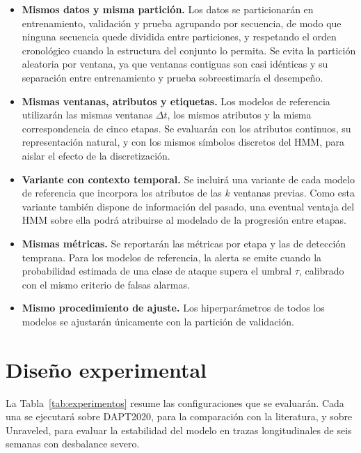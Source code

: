 \begin{itemize}
    \item \textbf{Mismos datos y misma partición.} Los datos se particionarán en entrenamiento, validación y prueba agrupando por secuencia, de modo que ninguna secuencia quede dividida entre particiones, y respetando el orden cronológico cuando la estructura del conjunto lo permita. Se evita la partición aleatoria por ventana, ya que ventanas contiguas son casi idénticas y su separación entre entrenamiento y prueba sobreestimaría el desempeño.
    \item \textbf{Mismas ventanas, atributos y etiquetas.} Los modelos de referencia utilizarán las mismas ventanas $\Delta t$, los mismos atributos y la misma correspondencia de cinco etapas. Se evaluarán con los atributos continuos, su representación natural, y con los mismos símbolos discretos del HMM, para aislar el efecto de la discretización.
    \item \textbf{Variante con contexto temporal.} Se incluirá una variante de cada modelo de referencia que incorpora los atributos de las $k$ ventanas previas. Como esta variante también dispone de información del pasado, una eventual ventaja del HMM sobre ella podrá atribuirse al modelado de la progresión entre etapas.
    \item \textbf{Mismas métricas.} Se reportarán las métricas por etapa y las de detección temprana. Para los modelos de referencia, la alerta se emite cuando la probabilidad estimada de una clase de ataque supera el umbral $\tau$, calibrado con el mismo criterio de falsas alarmas.
    \item \textbf{Mismo procedimiento de ajuste.} Los hiperparámetros de todos los modelos se ajustarán únicamente con la partición de validación.
\end{itemize}

\section{Diseño experimental}
La Tabla~\ref{tab:experimentos} resume las configuraciones que se evaluarán. Cada una se ejecutará sobre DAPT2020, para la comparación con la literatura, y sobre Unraveled, para evaluar la estabilidad del modelo en trazas longitudinales de seis semanas con desbalance severo.

